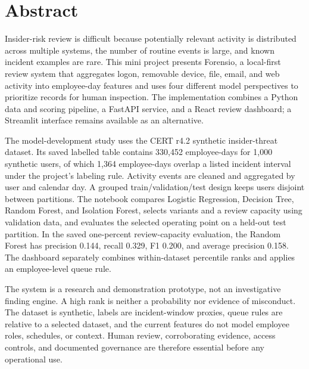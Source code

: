 \documentclass[12pt,a4paper,oneside]{report}
\begin{document}
\chapter*{Abstract}
Insider-risk review is difficult because potentially relevant activity
is distributed across multiple systems, the number of routine events is
large, and known incident examples are rare. This mini project presents
Forensio, a local-first review system that aggregates logon, removable
device, file, email, and web activity into employee-day features and
uses four different model perspectives to prioritize records for human
inspection. The implementation combines a Python data and scoring
pipeline, a FastAPI service, and a React review dashboard; a Streamlit
interface remains available as an alternative.

The model-development study uses the CERT r4.2 synthetic insider-threat
dataset. Its saved labelled table contains 330,452 employee-days for
1,000 synthetic users, of which 1,364 employee-days overlap a listed
incident interval under the project's labeling rule. Activity events
are cleaned and aggregated by user and calendar day. A grouped
train/validation/test design keeps users disjoint between partitions.
The notebook compares Logistic Regression, Decision Tree, Random
Forest, and Isolation Forest, selects variants and a review capacity
using validation data, and evaluates the selected operating point on a
held-out test partition. In the saved one-percent review-capacity
evaluation, the Random Forest has precision 0.144, recall 0.329, F1
0.200, and average precision 0.158. The dashboard separately combines
within-dataset percentile ranks and applies an employee-level queue
rule.

The system is a research and demonstration prototype, not an
investigative finding engine. A high rank is neither a probability nor
evidence of misconduct. The dataset is synthetic, labels are
incident-window proxies, queue rules are relative to a selected
dataset, and the current features do not model employee roles,
schedules, or context. Human review, corroborating evidence, access
controls, and documented governance are therefore essential before any
operational use.

\renewcommand{\listtablename}{List of tables}
\listoftables

\renewcommand{\listfigurename}{List of figures}
\listoffigures

\clearpage
\pagestyle{empty}
\tableofcontents
\end{document}
